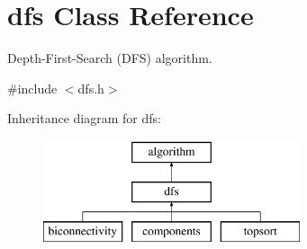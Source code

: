 \hypertarget{classdfs}{}\section{dfs Class Reference}
\label{classdfs}


Depth-\/\+First-\/\+Search (D\+FS) algorithm.  




{\ttfamily \#include $<$dfs.\+h$>$}

Inheritance diagram for dfs\+:\begin{figure}[H]
\begin{center}
\leavevmode
\includegraphics[height=3.000000cm]{classdfs}
\end{center}
\end{figure}
